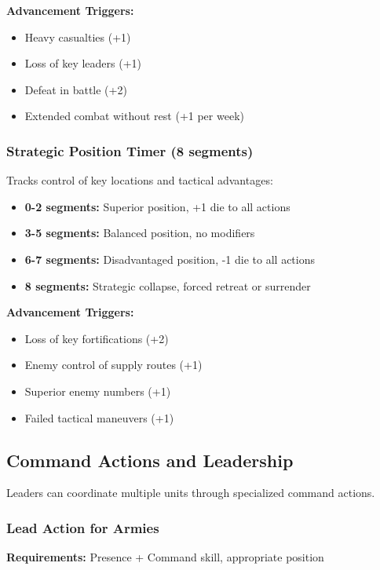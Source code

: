 \documentclass[11pt,letterpaper]{article}
\begin{document}
\textbf{Advancement Triggers:}
\begin{itemize}[leftmargin=*]
    \item Heavy casualties (+1)
    \item Loss of key leaders (+1)
    \item Defeat in battle (+2)
    \item Extended combat without rest (+1 per week)
\end{itemize}

\subsubsection{Strategic Position Timer (8 segments)}

Tracks control of key locations and tactical advantages:
\begin{itemize}[leftmargin=*]
    \item \textbf{0-2 segments:} Superior position, +1 die to all actions
    \item \textbf{3-5 segments:} Balanced position, no modifiers
    \item \textbf{6-7 segments:} Disadvantaged position, -1 die to all actions
    \item \textbf{8 segments:} Strategic collapse, forced retreat or surrender
\end{itemize}

\textbf{Advancement Triggers:}
\begin{itemize}[leftmargin=*]
    \item Loss of key fortifications (+2)
    \item Enemy control of supply routes (+1)
    \item Superior enemy numbers (+1)
    \item Failed tactical maneuvers (+1)
\end{itemize}

\subsection{Command Actions and Leadership}

Leaders can coordinate multiple units through specialized command actions.

\subsubsection{Lead Action for Armies}

\textbf{Requirements:} Presence + Command skill, appropriate position
\end{document}
